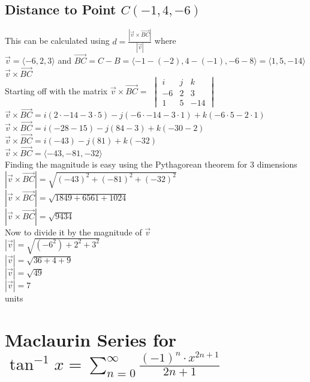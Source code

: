 \documentclass{article}
\begin{document}
\subsection{Distance to Point $C(-1,4,-6)$}
This can be calculated using $d=\frac{|\vec{v}\times\vec{BC}|}{|\vec{v}|} $ where 
\\[0.1in]$\vec{v}= \langle-6, 2, 3\rangle$ and $\vec{BC}=C-B =\langle-1-(-2), 4-(-1), -6-8\rangle = \langle1, 5, -14\rangle$
\textbf{$\vec{v}\times\vec{BC}$}
\\[0.1in]Starting off with the matrix
$\vec{v} \times \vec{BC} = $
$\begin{vmatrix}
i & j & k \\
-6 & 2 & 3 \\
1 & 5 & -14
\end{vmatrix}$
\\[0.05in]$\vec{v}\times\vec{BC} = i(2\cdot-14-3\cdot5)-j(-6\cdot-14-3\cdot 1)+k(-6\cdot5-2\cdot1)$
\\[0.05in]$\vec{v}\times\vec{BC} = i(-28-15)-j(84-3)+k(-30-2)$
\\[0.05in]$\vec{v}\times\vec{BC} = i(-43)-j(81)+k(-32)$
\\[0.05in]$\vec{v}\times\vec{BC} = \langle-43,-81,-32\rangle$
\\Finding the magnitude is easy using the Pythagorean theorem for 3 dimensions
\\$|\vec{v}\times\vec{BC}|=\sqrt{(-43)^2+(-81)^2+(-32)^2}$
\\$|\vec{v}\times\vec{BC}|=\sqrt{1849+6561+1024}$
\\$|\vec{v}\times\vec{BC}|=\boxed{\sqrt{9434}}$
\\[0.05in]Now to divide it by the magnitude of $\vec{v}$
\\[0.05in]$|\vec{v}| = \sqrt{(-6^2)+2^2+3^2}$
\\$|\vec{v}| = \sqrt{36+4+9}$
\\$|\vec{v}| = \sqrt{49}$
\\$|\vec{v}| = 7$
\\ units


\pagebreak
\section{Maclaurin Series for $\tan^{-1}x=\sum_{n=0}^{\infty}\frac{(-1)^n\cdot x^{2n+1}}{2n+1}$}
\end{document}
